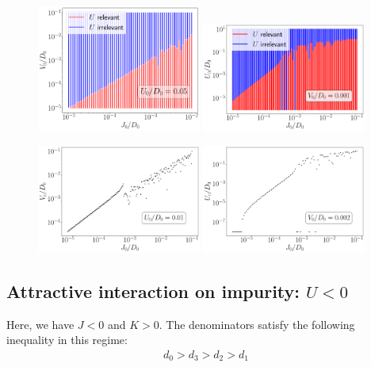\documentclass{report}
\numberwithin{equation}{section}
\begin{document}
\begin{figure}[htpb]
	\centering
	\includegraphics[width=0.48\textwidth]{../figures/VvsJ_relvsirr.pdf}
	\hspace*{\fill}
	\includegraphics[width=0.48\textwidth]{../figures/UvsJ_relvsirr.pdf}
\end{figure}

\begin{figure}[htpb]
	\centering
	\includegraphics[width=0.48\textwidth]{../figures/VcvsJ.pdf}
	\hspace*{\fill}
	\includegraphics[width=0.48\textwidth]{../figures/UcvsJ.pdf}
\end{figure}

\subsection{Attractive interaction on impurity: \(U<0\)}
Here, we have \(J<0\) and \(K>0\). The denominators satisfy the following inequality in this regime:
\begin{equation}\begin{aligned}
	d_0 > d_3 > d_2 > d_1
\end{aligned}\end{equation}
\end{document}
